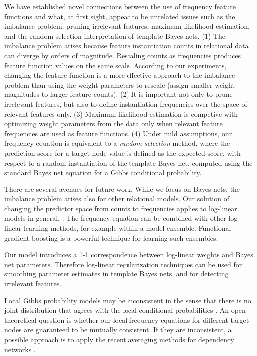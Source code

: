 \documentclass[runningheads,a4paper]{llncs}
\begin{document}
We have established novel connections between the use of frequency feature functions and what, at first sight, appear to be unrelated issues such as the imbalance problem, pruning irrelevant features, maximum likelihood estimation, and the random selection interpretation of template Bayes nets. (1) The imbalance problem arises because feature instantiation counts in relational data can diverge by orders of magnitude. Rescaling counts as frequencies produces feature function values on the same scale. According to our experiments, changing the feature function is a more effective approach to the imbalance problem than using the weight parameters to rescale (assign smaller weight magnitudes to larger feature counts). (2) It is important not only to prune irrelevant features, but also to define instantiation frequencies over the space of relevant features only. (3) Maximum likelihood estimation is competive with optimizing weight parameters from the data only when relevant feature frequencies are used as feature functions. (4) Under mild assumptions, our frequency equation is equivalent to a {\em random selection} method, where the prediction score for a target node value is defined as the expected score, with respect to a random instantiation of the template Bayes net, computed using the standard Bayes net equation for a Gibbs conditional probability.

There are several avenues for future work. While we focus on Bayes nets, the imbalance problem arises also for other relational models. Our solution of changing the predictor space from counts to frequencies applies to log-linear models in general.
\cite{Sutton2007,Taskar2002,Domingos2009}.
The frequency equation can be combined with other log-linear learning methods, for example within a model ensemble. Functional gradient boosting \cite{Khot2011} is a powerful technique for learning such ensembles. 

Our model introduces a 1-1 correspondence between log-linear weights and Bayes net parameters. Therefore log-linear regularization techniques \cite{Huynh2008} can be used for smoothing parameter estimates in template Bayes nets, and for detecting irrelevant features. 

Local Gibbs probability models  may be inconsistent in the sense that there is no joint distribution that agrees with the local conditional probabilities \cite{Heckerman2000}. An open theoretical question is whether our local frequency equations for different target nodes are guaranteed to be mutually consistent. If they are inconsistent, a possible approach is to apply the recent averaging methods for dependency networks \cite{Lowd2012,Poole2013}.
\end{document}
